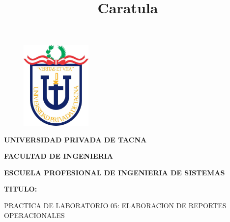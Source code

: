 \documentclass[12pt,letterpaper]{article}
\begin{document}
%

  
\title{Caratula}

\begin{titlepage}
    \begin{center}
    \begin{figure}[htb]
    \begin{center}
    \includegraphics[width=3.5cm]{./img/upt.jpg}
    \end{center}
    \end{figure}
    
    \vspace*{0.15in}
    \begin{Large}
    \textbf{UNIVERSIDAD PRIVADA DE TACNA}\\
    \end{Large}
    
    \vspace*{0.1in}
    \begin{Large}
    \textbf{FACULTAD DE INGENIERIA} \\
    \end{Large}
    
    \vspace*{0.1in}
    \begin{Large}
    \textbf{ESCUELA PROFESIONAL DE INGENIERIA DE SISTEMAS} \\
    \end{Large}
    
    \vspace*{0.5in}
    \begin{Large}
    \textbf{TITULO:}\\
    \end{Large}
    

\vspace*{0.1in}
\begin{Large}
    PRACTICA DE LABORATORIO 05: ELABORACION DE REPORTES OPERACIONALES\\
\end{Large}


\end{center}
\end{titlepage}
\end{document}
